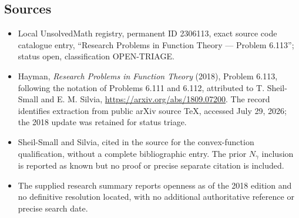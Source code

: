 \documentclass[11pt]{article}
\begin{document}
\subsection{Sources}
\begin{itemize}
\item Local UnsolvedMath registry, permanent ID 2306113, exact source code catalogue entry, ``Research Problems in Function Theory --- Problem 6.113''; status open, classification OPEN-TRIAGE.
\item Hayman, \emph{Research Problems in Function Theory} (2018), Problem 6.113, following the notation of Problems 6.111 and 6.112, attributed to T. Sheil-Small and E. M. Silvia, \url{https://arxiv.org/abs/1809.07200}. The record identifies extraction from public arXiv source TeX, accessed July 29, 2026; the 2018 update was retained for status triage.
\item Sheil-Small and Silvia, cited in the source for the convex-function qualification, without a complete bibliographic entry. The prior $N_\gamma$ inclusion is reported as known but no proof or precise separate citation is included.
\item The supplied research summary reports openness as of the 2018 edition and no definitive resolution located, with no additional authoritative reference or precise search date.
\end{itemize}
\end{document}
